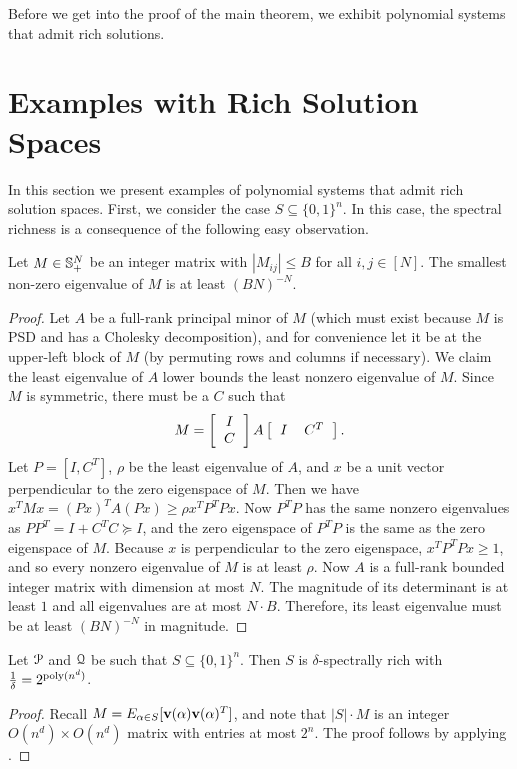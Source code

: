 \documentclass[a4paper,UKenglish]{lipics-v2016}
\begin{document}
Before we get into the proof of the main theorem, we exhibit polynomial systems that admit rich solutions.

\section{Examples with Rich Solution Spaces}
\label{sec:nicespaces}
In this section we present examples of polynomial systems that admit rich solution spaces. First, we consider the case $S \subseteq \{0,1\}^n$. In this case, the spectral richness is a consequence of the following easy observation.
\begin{lemma} \label{lem:integer}
	Let $M \in \mathbb{S}_+^{N}$ be an integer matrix with $|M_{ij}| \leq B$ for all $i,j \in [N]$.  The smallest non-zero eigenvalue of $M$ is at least 
	$(BN)^{-N}$.
\end{lemma}
\begin{proof}
Let $A$ be a full-rank principal minor of $M$ (which must exist because $M$ is PSD and has a Cholesky decomposition), and for convenience let it be at the upper-left block of $M$ (by permuting rows and columns if necessary). We claim the least eigenvalue of $A$ lower bounds the least nonzero eigenvalue of $M$.
Since $M$ is symmetric, there must be a $C$ such that
\[M = \left[\begin{tabular}{c} $I$ \\ $C$\end{tabular}\right]A\left[\begin{tabular}{cc} $I$ & $C^T$\end{tabular}\right].\]
Let $P = [I, C^T]$, $\rho$ be the least eigenvalue of $A$, and $x$ be a unit vector perpendicular to the zero eigenspace of $M$. Then we have $x^TMx = (Px)^TA(Px) \geq \rho x^TP^TPx$.
Now $P^TP$ has the same nonzero eigenvalues as $PP^T = I + C^TC \succeq I$, and the zero eigenspace of $P^TP$ is the same as the zero eigenspace of $M$. Because $x$ is perpendicular to the zero eigenspace, $x^TP^TPx \geq 1$, and so every nonzero eigenvalue of $M$ is at least $\rho$. Now $A$ is a full-rank bounded integer matrix with dimension at most $N$. The magnitude of its determinant is at least $1$ and all eigenvalues are at most $N \cdot B$.  Therefore, its least eigenvalue must be at least $(BN)^{-N}$ in magnitude. 
\end{proof}

\begin{lemma}\label{lem:integer-rich}
Let $\mathcal P$ and $\mathcal Q$ be such that $S \subseteq \{0,1\}^n$. Then $S$ is $\delta$-spectrally rich with $\frac{1}{\delta} = 2^{\operatorname{poly}(n^d)}$.
\end{lemma}
\begin{proof}
	Recall $M = E_{\alpha \in S}[{\bf v}(\alpha){\bf v}(\alpha)^T]$, and note that $|S| \cdot M$ is an integer $O(n^d) \times O(n^d)$ matrix with entries at most $2^n$.  The proof follows by applying . 
\end{proof}
\end{document}
